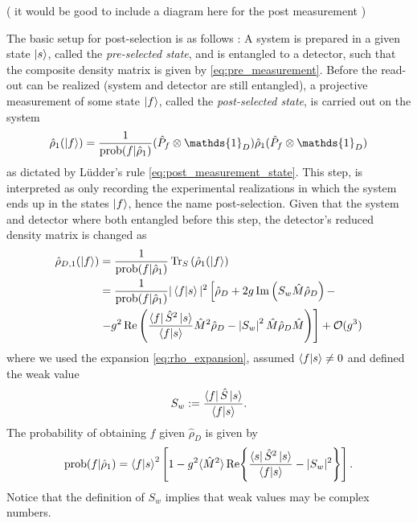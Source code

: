 \documentclass{article}
\newcommand{\Id}{\mathds{1}}
\newcommand\sj[1]{ {\color{orange} #1} }
\begin{document}
(\sj{it would be good to include a diagram here for the post measurement})


The basic setup for post-selection is as follows \cite{svenssonPedagogicalWeak2013}: A system is 
prepared in a given state $\ket{s}$, called the \textit{pre-selected state}, and is entangled to 
a detector, such that the composite density matrix is given by 
\eqref{eq:pre_measurement}. Before the read-out can be realized (system and detector are
still entangled), a projective measurement of some state $\ket{f}$, called the \textit{post-selected state}, is carried out on the system
\begin{align}
    \hat{\rho}_1 (\ket{f}) = \frac{1}{\text{prob}(f|\hat{\rho}_1)} (\hat{P}_f \otimes \Id_D )
    \hat{\rho}_1 (\hat{P}_f \otimes \Id_D )
\end{align}
as dictated by Lüdder's rule \eqref{eq:post_measurement_state}. This step, is interpreted as only recording the 
experimental realizations in which the system ends up in the states $\ket{f}$, hence the name
post-selection. Given that the system and detector where both entangled before this step,
the detector's reduced density matrix is changed as 
 \begin{align}
    \hat{\rho}_{D,1} (\ket{f}) & = \frac{1}{\text{prob}(f|\hat{\rho}_1)}\Tr_S{(\hat{\rho}_1 (\ket{f}) } \nonumber\\
    & =\frac{1}{\text{prob}(f|\hat{\rho}_1)}|\bra{f} \ket{s}|^2\left[\hat{\rho}_D+2 g \Im\left(S_w \hat{M} \hat{\rho}_D\right)- \right. \\
    &\left. - g^2 \Re\left(\frac{\bra{f} \hat{S}^2\ket{s}}{\bra{f} \ket{s}} \hat{M}^2 \hat{\rho}_D-\left|S_w\right|^2 \hat{M} \hat{\rho}_D \hat{M}\right)\right] + \mathcal{O}(g^3) \nonumber
\end{align}
where we used the expansion \eqref{eq:rho_expansion}, assumed $\bra{f}\ket{s}\neq 0$ and defined the weak value 
\begin{align}
    S_w := \frac{ \bra{f} \hat{S}\ket{s} }{\bra{f}\ket{s}}.
\end{align}
The probability of obtaining $f$ given $\hat{\rho}_D$ is given by 
\begin{align}
    \text{prob}(f|\hat{\rho}_1) = \bra{f}\ket{s}^2 \left[  1- g^2 \langle \hat{M}^2\rangle
        \Re{ \frac{\bra{s} \hat{S}^2\ket{s}}{\bra{f}\ket{s}} - |S_w|^2} \right].
\end{align}
Notice that the definition of $S_w$ implies that weak values may be complex numbers. 
\end{document}
